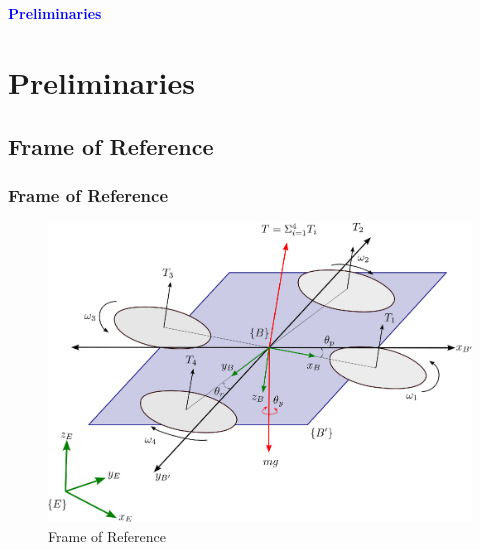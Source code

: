 \documentclass[10pt]{beamer}
\begin{document}
\section*{}
\begin{frame}{}
	\huge{\centerline{\textcolor{blue}{\textbf{Preliminaries}}}}
\end{frame}
\section{Preliminaries}
\subsection*{Frame of Reference}
\begin{frame}
	\frametitle{Frame of Reference}
	\begin{figure}[h!]
		\centering
		\includegraphics[scale=0.5]{Quadcopter.eps}
		\caption{Frame of Reference}
		\label{Fig:Frame_of_Reference}
	\end{figure}
\end{frame}
\end{document}
